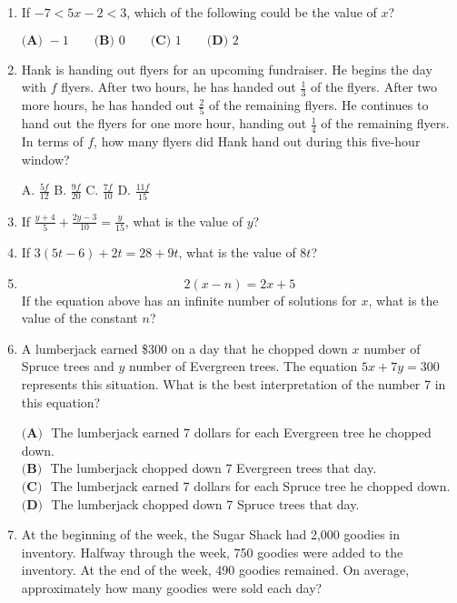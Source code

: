 \documentclass[../satmath.tex]{subfiles}
\begin{document}
\begin{enumerate}[label=\bfseries\arabic*.]
\item %
If $-7<5x-2<3$, which of the following could be the value of $x$?

$\textbf{(A) } -1 \qquad \textbf{(B) } 0 \qquad \textbf{(C) } 1 \qquad \textbf{(D) } 2$

\item %
Hank is handing out flyers for an upcoming fundraiser. He begins the day with $f$ flyers. After two hours, he has handed out $\frac{1}{3}$ of the flyers. After two more hours, he has handed 
out $\frac{2}{5}$ of the remaining flyers. He continues to hand out the flyers for one more hour, handing out $\frac{1}{4}$ of the remaining flyers.
In terms of $f$, how many flyers did Hank hand out during this five-hour window?

A. $\frac{5f}{12}$ \quad B. $\frac{9f}{20}$ \quad C. $\frac{7f}{10}$ \quad D. $\frac{11f}{15}$

\item %
If $\frac{y+4}{5}+\frac{2y-3}{10}=\frac{y}{15}$, what is the value of $y$?

\item %
If $3(5t-6)+2t=28+9t$, what is the value of $8t$?

\item %
\[2(x-n)=2x+5\]
If the equation above has an infinite number of solutions for $x$, what is the value of the constant $n$?

\item %
A lumberjack earned \$300 on a day that he chopped down $x$ number of Spruce trees and $y$ number of Evergreen trees. The equation 
$5x+7y=300$ represents this situation. What is the best interpretation of the number 7 in this equation?

$\textbf{(A) }$ The lumberjack earned 7 dollars for each Evergreen tree he chopped down. \\
$\textbf{(B) }$ The lumberjack chopped down 7 Evergreen trees that day.\\
$\textbf{(C) }$ The lumberjack earned 7 dollars for each Spruce tree he chopped down. \\
$\textbf{(D) }$ The lumberjack chopped down 7 Spruce trees that day.

\item %
At the beginning of the week, the Sugar Shack had 2,000 goodies in inventory. Halfway through the week, 750 goodies were added to the inventory.
At the end of the week, 490 goodies remained. On average, approximately how many goodies were sold each day?


\end{enumerate}
\end{document}
